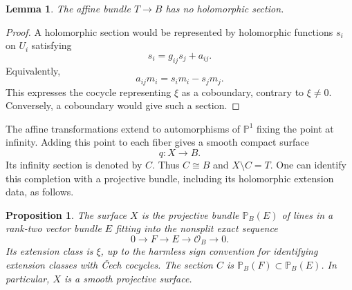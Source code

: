 \documentclass[11pt,a4paper]{article}
\numberwithin{equation}{section}
\newtheorem{proposition}[theorem]{Proposition}
\newtheorem{lemma}[theorem]{Lemma}
\theoremstyle{definition}
\theoremstyle{remark}
\renewcommand{\P}{\mathbb P}
\newcommand{\OO}{\mathcal O}
\begin{document}
\begin{lemma}\label{geo:no-section}
The affine bundle $T\to B$ has no holomorphic section.
\end{lemma}

\begin{proof}
A holomorphic section would be represented by holomorphic functions
$s_i$ on $U_i$ satisfying
\[
  s_i=g_{ij}s_j+a_{ij}.
\]
Equivalently,
\[
  a_{ij}m_i=s_im_i-s_jm_j.
\]
This expresses the cocycle representing $\xi$ as a coboundary, contrary
to $\xi\ne0$.  Conversely, a coboundary would give such a section.
\end{proof}

The affine transformations extend to automorphisms of $\P^1$ fixing
the point at infinity.  Adding this point to each fiber gives a smooth
compact surface
\[
  q:X\longrightarrow B.
\]
Its infinity section is denoted by $C$.  Thus $C\cong B$ and
$X\setminus C=T$.  One can identify this completion with a projective
bundle, including its holomorphic extension data, as follows.

\begin{proposition}\label{geo:projective-bundle}
The surface $X$ is the projective bundle $\P_B(E)$ of lines in a
rank-two vector bundle $E$ fitting into the nonsplit exact sequence
\begin{equation}\label{geo:extension}
  0\longrightarrow F\longrightarrow E\longrightarrow\OO_B
    \longrightarrow0.
\end{equation}
Its extension class is $\xi$, up to the harmless sign convention for
identifying extension classes with \v{C}ech cocycles.  The section $C$ is
$\P_B(F)\subset\P_B(E)$.  In particular, $X$ is a smooth projective
surface.
\end{proposition}
\end{document}
